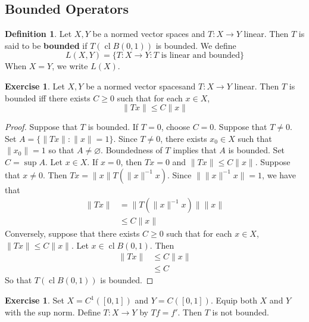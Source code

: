 \documentclass[12pt]{amsart}
\theoremstyle{definition}
\newtheorem{defn}[definition]{Definition}
\newtheorem{ex}[definition]{Exercise}
\newcommand{\tbf}[1]{\textbf{#1}}
\DeclareMathOperator{\cl}{cl}
\DeclareMathOperator*{\0}{\mbf{0}}
\DeclareMathOperator*{\1}{\mbf{1}}
\newcommand{\lex}[1]{\label{ex:#1}}
\newcommand{\ld}[1]{\label{defn:#1}}
\begin{document}
	
	
	
	
	
	
	
	
	
	
	
	
	\newpage
	\subsection{Bounded Operators}
	
	\begin{defn} \ld{42001} 
		Let $X,Y$ be a normed vector spaces and $T:X \rightarrow Y$ linear. Then $T$ is said to be \tbf{bounded} if $T(\cl B(0,1))$ is bounded. We define $$L(X,Y) = \{T:X \rightarrow Y: T \text{ is linear and bounded}\}$$
		When $X=Y$, we write $L(X)$.
	\end{defn}
	
	\begin{ex} \ld{42001.1} 
		Let $X,Y$ be a normed vector spacesand $T:X \rightarrow Y$ linear. Then $T$ is bounded iff there exists $C \geq 0$ such that for each $x \in X$, $$\|Tx \|\leq C \|x \|$$ 
	\end{ex}
	
	\begin{proof}
	Suppose that $T$ is bounded. If $T = 0$, choose $C = 0$. Suppose that $T \neq 0$. Set $ A = \{\|Tx\|: \|x\| =1\}$. Since $T \neq 0$, there exists $x_0 \in X$ such that $\|x_0\| = 1$ so that $A \neq \varnothing$.  Boundedness of $T$ implies that $A$ is bounded. Set $C = \sup A$. Let $x \in X$. If $x = 0$, then $Tx = 0$ and $\|Tx\| \leq C \|x\|$. Suppose that $x \neq 0$. Then $Tx = \|x\| T(\|x\|^{-1} x)$. Since $\|\|x\|^{-1} x\| = 1$, we have that
	\begin{align*}
	\|Tx\|
	&= \|T(\|x\|^{-1} x)\| \|x\|  \\
	& \leq C\|x\| 
\end{align*}	
Conversely, suppose that there exists $C \geq 0$ such that for each $x \in X$, $\|Tx \|\leq C \|x \|$. Let $x \in \cl B(0,1)$. Then 
	\begin{align*}
	\|Tx\| 
	&\leq C \|x\| \\
	&\leq C
	\end{align*}
So that $T(\cl B(0,1))$ is bounded. 
	\end{proof}
	
	\begin{ex} \lex{42002}
	Set $X = C^{1}([0,1])$ and $Y = C([0,1])$. Equip both $X$ and $Y$ with the sup norm. Define $T:X \rightarrow Y$ by $Tf = f'$. Then $T$ is not bounded.
	\end{ex}
	
\end{document}
